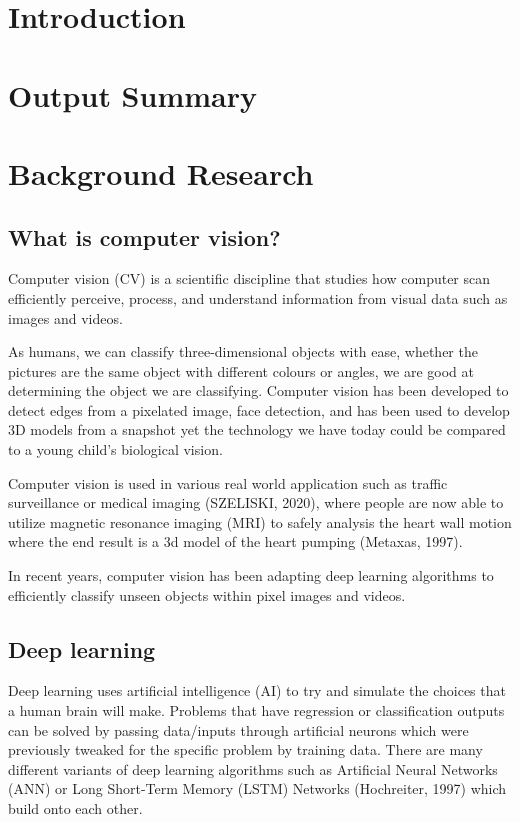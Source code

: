 \documentclass[12pt]{report}
\begin{document}
\thispagestyle{empty}   %

\tableofcontents

\chapter{Introduction}

\chapter{Output Summary}

\chapter{Background Research}


\section{What is computer vision?}


Computer vision (CV) is a scientific discipline that studies how computer scan efficiently perceive, process, and understand information from visual data such as images and videos.

As humans, we can classify three-dimensional objects with ease, whether the pictures are the same object with different colours or angles, we are good at determining the object we are classifying. 
Computer vision has been developed to detect edges from a pixelated image, face detection, and has been used to develop 3D models from a snapshot yet the technology we have today could be compared to a young child's biological vision. 

Computer vision is used in various real world application such as traffic surveillance or medical imaging (SZELISKI, 2020), where people are now able to utilize magnetic resonance imaging (MRI) to safely analysis the heart wall motion where the end result is a 3d model of the heart pumping (Metaxas, 1997). 

In recent years, computer vision has been adapting deep learning algorithms to efficiently classify unseen objects within pixel images and videos. 


\section{Deep learning}

Deep learning uses artificial intelligence (AI) to try and simulate the choices that a human brain will make. Problems that have regression or classification outputs can be solved by passing data/inputs through artificial neurons which were previously tweaked for the specific problem by training data. There are many different variants of deep learning algorithms such as Artificial Neural Networks (ANN) or Long Short-Term Memory (LSTM) Networks (Hochreiter, 1997) which build onto each other.
\end{document}
